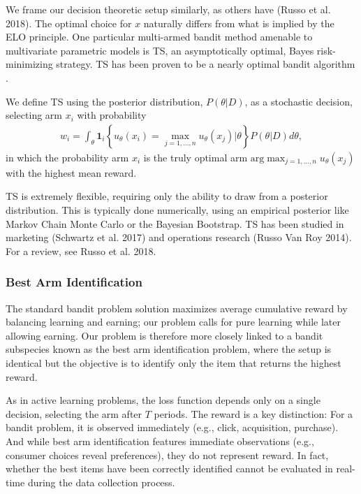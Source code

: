 \documentclass[nonblindrev]{informs3}
\begin{document}
We frame our decision theoretic setup similarly, as others have (Russo et al. 2018). The optimal choice for $x$ naturally differs from what is implied by the ELO principle. One particular multi-armed bandit method amenable to multivariate parametric models is TS, an asymptotically optimal, Bayes risk-minimizing strategy. TS has been proven to be a nearly optimal bandit algorithm \citep{RussoVanRoy2015}. 

We define TS using the posterior distribution, $P(\theta|D)$, as a stochastic decision, selecting arm $x_i$ with probability
\begin{align} 
w_i = \int_\theta \mathbf{1}_i\left\{ u_\theta(x_i) = \max_{j=1,\ldots,n} u_\theta(x_j) | \theta \right\} P(\theta|D)d\theta ,
\end{align}
in which the probability arm $x_i$ is the truly optimal arm $\text{arg}\max_{j=1,\ldots,n} u_\theta(x_j)$ with the highest mean reward. 

TS is extremely flexible, requiring only the ability to draw from a posterior distribution. This is typically done numerically, using an empirical posterior like Markov Chain Monte Carlo or the Bayesian Bootstrap. TS has been studied in marketing (Schwartz et al. 2017) and operations research (Russo Van Roy 2014). For a review, see Russo et al. 2018. 

\subsubsection{Best Arm Identification}

The standard bandit problem solution maximizes average cumulative reward by balancing learning and earning; our problem calls for pure learning while later allowing earning. Our problem is therefore more closely linked to a bandit subspecies known as the best arm identification problem, where the setup is identical but the objective is to identify only the item that returns the highest reward. 

As in active learning problems, the loss function depends only on a single decision, selecting the arm after $T$ periods. The reward is a key distinction: For a bandit problem, it is observed immediately (e.g., click, acquisition, purchase). And while best arm identification features immediate observations (e.g., consumer choices reveal preferences), they do not represent reward. In fact, whether the best items have been correctly identified cannot be evaluated in real-time during the data collection process. 
\end{document}
